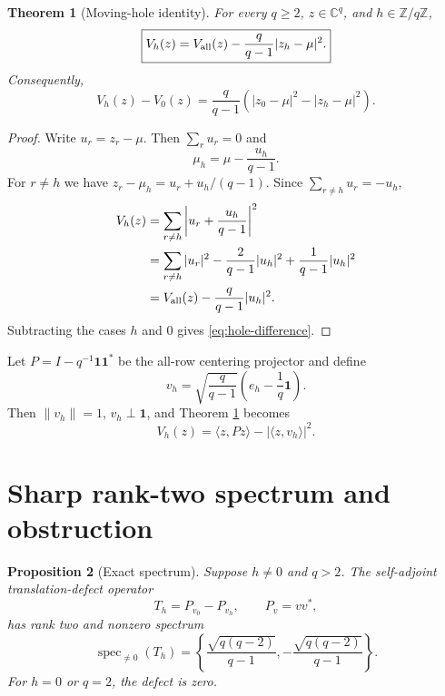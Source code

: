 \documentclass[11pt]{article}
\newtheorem{theorem}{Theorem}[section]
\newtheorem{proposition}[theorem]{Proposition}
\newcommand{\Fq}{\mathbb Z/q\mathbb Z}
\newcommand{\one}{\mathbf 1}
\begin{document}
\begin{theorem}[Moving-hole identity]\label{thm:moving-hole}
For every $q\ge2$, $z\in\mathbb C^q$, and $h\in\Fq$,
\begin{equation}\label{eq:main-identity}
 \boxed{V_h(z)=V_{\rm all}(z)-\frac q{q-1}|z_h-\mu|^2.}
\end{equation}
Consequently,
\begin{equation}\label{eq:hole-difference}
 V_h(z)-V_0(z)=\frac q{q-1}
 \left(|z_0-\mu|^2-|z_h-\mu|^2\right).
\end{equation}
\end{theorem}

\begin{proof}
Write $u_r=z_r-\mu$.  Then $\sum_r u_r=0$ and
\[
 \mu_h=\mu-\frac{u_h}{q-1}.
\]
For $r\ne h$ we have $z_r-\mu_h=u_r+u_h/(q-1)$.  Since
$\sum_{r\ne h}u_r=-u_h$,
\begin{align*}
 V_h(z)
 &=\sum_{r\ne h}\left|u_r+\frac{u_h}{q-1}\right|^2\\
 &=\sum_{r\ne h}|u_r|^2
   -\frac{2}{q-1}|u_h|^2+\frac1{q-1}|u_h|^2\\
 &=V_{\rm all}(z)-\frac q{q-1}|u_h|^2.
\end{align*}
Subtracting the cases $h$ and $0$ gives \eqref{eq:hole-difference}.
\end{proof}

Let $P=I-q^{-1}\one\one^*$ be the all-row centering projector and define
\[
 v_h=\sqrt{\frac q{q-1}}\left(e_h-\frac1q\one\right).
\]
Then $\|v_h\|=1$, $v_h\perp\one$, and Theorem
\ref{thm:moving-hole} becomes
\begin{equation}\label{eq:projector-form}
 V_h(z)=\langle z,Pz\rangle-|\langle z,v_h\rangle|^2.
\end{equation}

\section{Sharp rank-two spectrum and obstruction}

\begin{proposition}[Exact spectrum]\label{prop:spectrum}
Suppose $h\ne0$ and $q>2$.  The self-adjoint translation-defect operator
\[
 T_h=P_{v_0}-P_{v_h},\qquad P_v=vv^*,
\]
has rank two and nonzero spectrum
\begin{equation}\label{eq:spectrum}
 \boxed{\operatorname{spec}_{\ne0}(T_h)=
 \left\{\frac{\sqrt{q(q-2)}}{q-1},
 -\frac{\sqrt{q(q-2)}}{q-1}\right\}.}
\end{equation}
For $h=0$ or $q=2$, the defect is zero.
\end{proposition}
\end{document}
